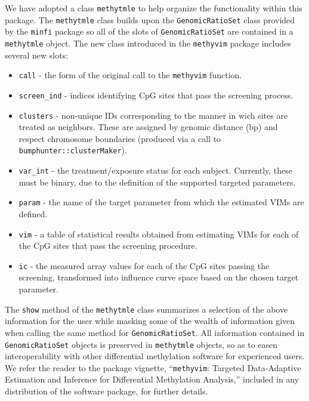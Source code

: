 \documentclass[9pt,a4paper,]{extarticle}
\theoremstyle{definition}
\theoremstyle{definition}
\theoremstyle{definition}
\theoremstyle{remark}
\begin{document}
We have adopted a class \texttt{methytmle} to help organize the functionality within
this package. The \texttt{methytmle} class builds upon the \texttt{GenomicRatioSet} class
provided by the \texttt{minfi} package so all of the slots of \texttt{GenomicRatioSet} are
contained in a \texttt{methytmle} object. The new class introduced in the \texttt{methyvim}
package includes several new slots:

\begin{itemize}
\item
  \texttt{call} - the form of the original call to the \texttt{methyvim} function.
\item
  \texttt{screen\_ind} - indices identifying CpG sites that pass the screening process.
\item
  \texttt{clusters} - non-unique IDs corresponding to the manner in wich sites are
  treated as neighbors. These are assigned by genomic distance (bp) and respect
  chromosome boundaries (produced via a call to \texttt{bumphunter::clusterMaker}).
\item
  \texttt{var\_int} - the treatment/exposure status for each subject. Currently, these
  must be binary, due to the definition of the supported targeted parameters.
\item
  \texttt{param} - the name of the target parameter from which the estimated VIMs are
  defined.
\item
  \texttt{vim} - a table of statistical results obtained from estimating VIMs for
  each of the CpG sites that pass the screening procedure.
\item
  \texttt{ic} - the measured array values for each of the CpG sites passing the
  screening, transformed into influence curve space based on the chosen target
  parameter.
\end{itemize}

The \texttt{show} method of the \texttt{methytmle} class summarizes a selection of the above
information for the user while masking some of the wealth of information given
when calling the same method for \texttt{GenomicRatioSet}. All information contained in
\texttt{GenomicRatioSet} objects is preserved in \texttt{methytmle} objects, so as to easen
interoperability with other differential methylation software for experienced
users. We refer the reader to the package vignette, ``\texttt{methyvim}: Targeted
Data-Adaptive Estimation and Inference for Differential Methylation Analysis,''
included in any distribution of the software package, for further details.
\end{document}
